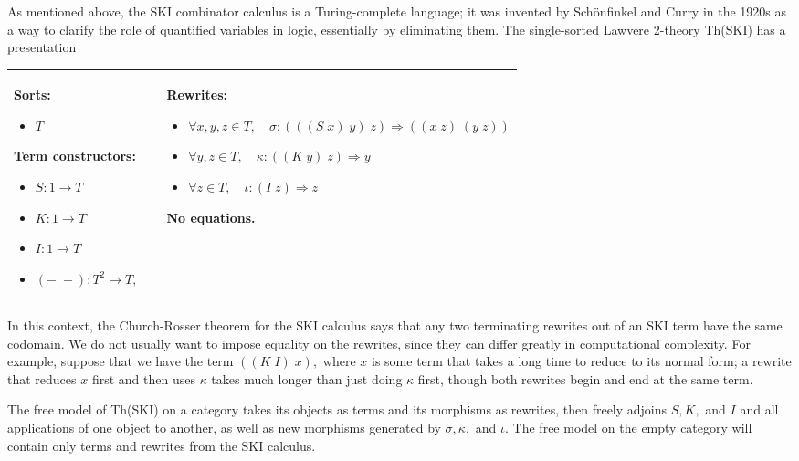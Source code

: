 \documentclass{llncs}
\newcommand{\maps}{\colon}
\begin{document}
As mentioned above, the SKI combinator calculus is a Turing-complete language; it was invented by Sch\"onfinkel \cite{Schonfinkel} and Curry \cite{Curry} in the 1920s as a way to clarify the role of quantified variables in logic, essentially by eliminating them.  The single-sorted Lawvere 2-theory Th(SKI) has a presentation
\begin{center}
  \begin{tabular}{|p{0.3\linewidth}|p{0.7\linewidth}|}
    \hline
    Sorts:
    \begin{itemize}
      \item $T$
    \end{itemize}
    Term constructors:
    \begin{itemize}
      \item $S\maps 1 \to T$
      \item $K\maps 1 \to T$
      \item $I\maps 1 \to T$
      \item $(-\;-)\maps T^2 \to T,$
    \end{itemize}
    &
    Rewrites:
    \begin{itemize}
      \item $\forall x,y,z \in T, \quad \sigma \maps (((S\; x)\; y)\; z) \Rightarrow ((x\; z)\; (y\; z))$
      \item $\forall y,z \in T, \quad \kappa \maps ((K\; y)\; z) \Rightarrow y$
      \item $\forall z \in T, \quad \iota \maps (I\; z) \Rightarrow z$
    \end{itemize}
    No equations.\\
    \hline
  \end{tabular}
\end{center}
In this context, the Church-Rosser theorem for the SKI calculus says that any two terminating rewrites out of an SKI term have the same codomain.  We do not usually want to impose equality on the rewrites, since they can differ greatly in computational complexity.  For example, suppose that we have the term $((K\; I)\; x),$ where $x$ is some term that takes a long time to reduce to its normal form; a rewrite that reduces $x$ first and then uses $\kappa$ takes much longer than just doing $\kappa$ first, though both rewrites begin and end at the same term.

The free model of Th(SKI) on a category takes its objects as terms and its morphisms as rewrites, then freely adjoins $S,K,$ and $I$ and all applications of one object to another, as well as new morphisms generated by $\sigma,\kappa,$ and $\iota.$  The free model on the empty category will contain only terms and rewrites from the SKI calculus.
\end{document}
